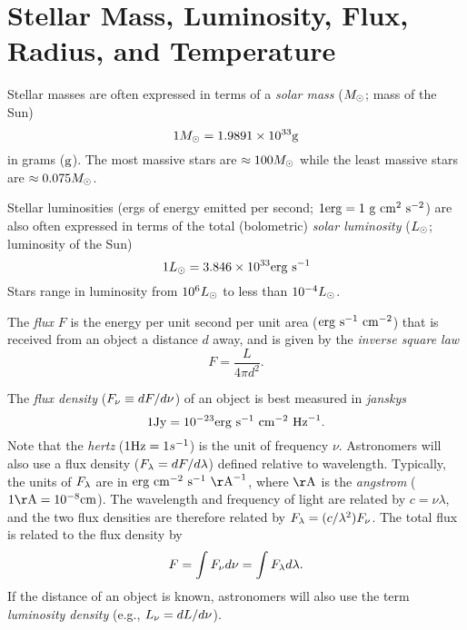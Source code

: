 \documentclass[]{article}
\begin{document}
\section{Stellar Mass, Luminosity, Flux, Radius, and Temperature}
Stellar masses are often expressed in terms of a {\it solar mass} ($M_{\odot}$; mass of the Sun)
\begin{equation}
1M_{\odot} = 1.9891\times10^{33}\mathrm{g}
\end{equation}
\noindent
in grams ($\mathrm{g}$). The most massive stars are $\approx100M_{\odot}$ while the
least massive stars are $\approx0.075M_{\odot}$.

Stellar luminosities (ergs of energy emitted per second; $1\mathrm{erg} = 1~\mathrm{g}~\mathrm{cm}^{2}~\mathrm{s}^{-2}$) are also 
often expressed in terms of the total (bolometric) {\it solar luminosity} ($L_{\odot}$; luminosity of the Sun)
\begin{equation}
1L_{\odot} = 3.846\times10^{33} \mathrm{erg}~\mathrm{s}^{-1}
\end{equation}
\noindent
Stars range in luminosity from $10^{6}L_{\odot}$ to less than $10^{-4}L_{\odot}$.

The {\it flux} $F$ is the energy per unit second per unit area ($\mathrm{erg}~\mathrm{s}^{-1}~\mathrm{cm}^{-2}$)
that is received from an object a distance $d$ away, and is
given by the {\it inverse square law}
\begin{equation}
\label{eqn:inverse_square}
F = \frac{L}{4\pi d^{2}}.
\end{equation}
\noindent

The {\it flux density} ($F_{\nu} \equiv dF/d\nu$) of an object is best measured in {\it janskys}
\begin{equation}
1\mathrm{Jy} = 10^{-23} \mathrm{erg}~\mathrm{s}^{-1}~\mathrm{cm}^{-2}~\mathrm{Hz}^{-1}.
\end{equation}
\noindent
Note that the {\it hertz} ($1\mathrm{Hz} = 1 s^{-1}$) is the unit of frequency $\nu$.
Astronomers will also use a flux density ($F_{\lambda} = dF/d\lambda$) 
defined relative to wavelength. Typically, the units of $F_{\lambda}$
are in $\erg~\cm^{-2}~\s^{-1}~\Ang^{-1}$, where $\Ang$ is the {\it angstrom}
($1\Ang = 10^{-8}\cm$). The wavelength and frequency of light are related by
$c = \nu \lambda$, and the two flux densities are therefore 
related by $F_{\lambda} = (c/\lambda^2)F_{\nu}$.
The total flux is related to the flux density by
\begin{equation}
F = \int F_{\nu} d \nu = \int F_{\lambda} d\lambda.
\end{equation}
\noindent
If the distance of an object is known, astronomers will also use the term
{\it luminosity density} (e.g., $L_{\nu} = dL/d\nu$).
\end{document}
